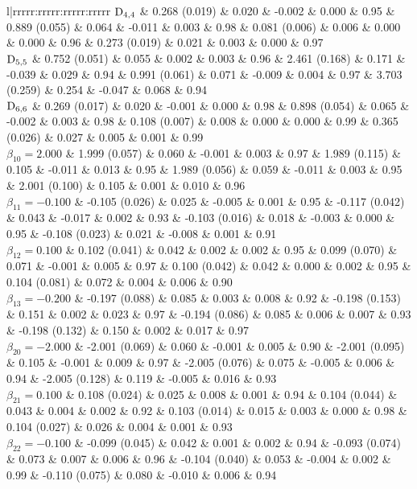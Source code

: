 \begin{landscape}
\begin{table}[ht]
\begin{tabular}{l|rrrrr:rrrrr:rrrrr:rrrrr}
  $\mathrm{D}_{4,4}$ &  0.268 (0.019) & 0.020 & -0.002 & 0.000 & 0.95 &  0.889 (0.055) & 0.064 & -0.011 & 0.003 & 0.98 &  0.081 (0.006) & 0.006 &  0.000 & 0.000 & 0.96 &  0.273 (0.019) & 0.021 &  0.003 & 0.000 & 0.97 \\ 
  $\mathrm{D}_{5,5}$ &  0.752 (0.051) & 0.055 &  0.002 & 0.003 & 0.96 &  2.461 (0.168) & 0.171 & -0.039 & 0.029 & 0.94 &  0.991 (0.061) & 0.071 & -0.009 & 0.004 & 0.97 &  3.703 (0.259) & 0.254 & -0.047 & 0.068 & 0.94 \\ 
  $\mathrm{D}_{6,6}$ &  0.269 (0.017) & 0.020 & -0.001 & 0.000 & 0.98 &  0.898 (0.054) & 0.065 & -0.002 & 0.003 & 0.98 &  0.108 (0.007) & 0.008 &  0.000 & 0.000 & 0.99 &  0.365 (0.026) & 0.027 &  0.005 & 0.001 & 0.99 \\ 
  $\beta_{10} = 2.000$ &  1.999 (0.057) & 0.060 & -0.001 & 0.003 & 0.97 &  1.989 (0.115) & 0.105 & -0.011 & 0.013 & 0.95 &  1.989 (0.056) & 0.059 & -0.011 & 0.003 & 0.95 &  2.001 (0.100) & 0.105 &  0.001 & 0.010 & 0.96 \\ 
  $\beta_{11} = -0.100$ & -0.105 (0.026) & 0.025 & -0.005 & 0.001 & 0.95 & -0.117 (0.042) & 0.043 & -0.017 & 0.002 & 0.93 & -0.103 (0.016) & 0.018 & -0.003 & 0.000 & 0.95 & -0.108 (0.023) & 0.021 & -0.008 & 0.001 & 0.91 \\ 
  $\beta_{12} = 0.100$ &  0.102 (0.041) & 0.042 &  0.002 & 0.002 & 0.95 &  0.099 (0.070) & 0.071 & -0.001 & 0.005 & 0.97 &  0.100 (0.042) & 0.042 &  0.000 & 0.002 & 0.95 &  0.104 (0.081) & 0.072 &  0.004 & 0.006 & 0.90 \\ 
  $\beta_{13} = -0.200$ & -0.197 (0.088) & 0.085 &  0.003 & 0.008 & 0.92 & -0.198 (0.153) & 0.151 &  0.002 & 0.023 & 0.97 & -0.194 (0.086) & 0.085 &  0.006 & 0.007 & 0.93 & -0.198 (0.132) & 0.150 &  0.002 & 0.017 & 0.97 \\ 
  $\beta_{20} = -2.000$ & -2.001 (0.069) & 0.060 & -0.001 & 0.005 & 0.90 & -2.001 (0.095) & 0.105 & -0.001 & 0.009 & 0.97 & -2.005 (0.076) & 0.075 & -0.005 & 0.006 & 0.94 & -2.005 (0.128) & 0.119 & -0.005 & 0.016 & 0.93 \\ 
  $\beta_{21} = 0.100$ &  0.108 (0.024) & 0.025 &  0.008 & 0.001 & 0.94 &  0.104 (0.044) & 0.043 &  0.004 & 0.002 & 0.92 &  0.103 (0.014) & 0.015 &  0.003 & 0.000 & 0.98 &  0.104 (0.027) & 0.026 &  0.004 & 0.001 & 0.93 \\ 
  $\beta_{22} = -0.100$ & -0.099 (0.045) & 0.042 &  0.001 & 0.002 & 0.94 & -0.093 (0.074) & 0.073 &  0.007 & 0.006 & 0.96 & -0.104 (0.040) & 0.053 & -0.004 & 0.002 & 0.99 & -0.110 (0.075) & 0.080 & -0.010 & 0.006 & 0.94 \\ 

\end{tabular}
\end{table}
\end{landscape}
